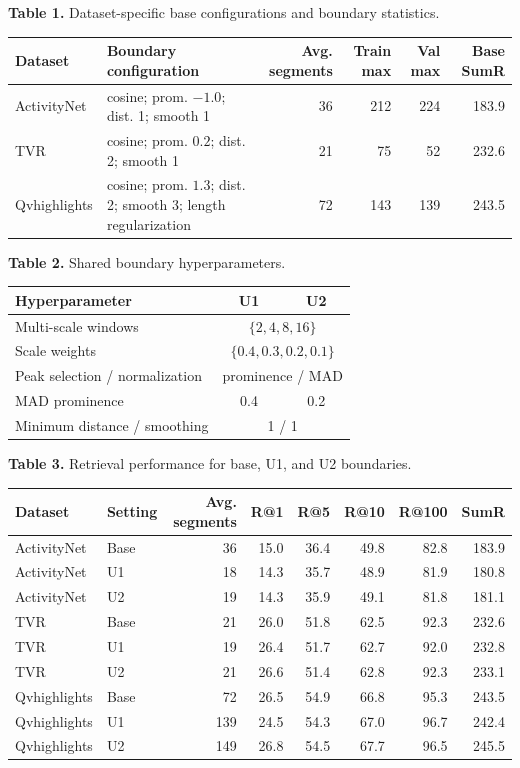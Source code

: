 \documentclass[10pt]{article}
\newcommand{\tablecaption}[2]{\begin{center}\footnotesize\textbf{Table #1.} #2\end{center}\vspace{-7pt}}
\begin{document}
\ifdefined\TABLE\else{}\fi
\ifcase\TABLE
\tablecaption{1}{Dataset-specific base configurations and boundary statistics.}
\begin{center}\small
\begin{tabular}{l l r r r r}
\toprule
Dataset & Boundary configuration & Avg. segments & Train max & Val max & Base SumR \\
\midrule
ActivityNet & cosine; prom. $-1.0$; dist. 1; smooth 1 & 36 & 212 & 224 & 183.9 \\
TVR & cosine; prom. $0.2$; dist. 2; smooth 1 & 21 & 75 & 52 & 232.6 \\
Qvhighlights & cosine; prom. $1.3$; dist. 2; smooth 3; length regularization & 72 & 143 & 139 & 243.5 \\
\bottomrule
\end{tabular}
\end{center}
\or
\tablecaption{2}{Shared boundary hyperparameters.}
\begin{center}\small
\begin{tabular}{l c c}
\toprule
Hyperparameter & U1 & U2 \\
\midrule
Multi-scale windows & \multicolumn{2}{c}{$\{2,4,8,16\}$} \\
Scale weights & \multicolumn{2}{c}{$\{0.4,0.3,0.2,0.1\}$} \\
Peak selection / normalization & \multicolumn{2}{c}{prominence / MAD} \\
MAD prominence & 0.4 & 0.2 \\
Minimum distance / smoothing & \multicolumn{2}{c}{1 / 1} \\
\bottomrule
\end{tabular}
\end{center}
\or
\tablecaption{3}{Retrieval performance for base, U1, and U2 boundaries.}
\begin{center}\small
\begin{tabular}{l l r r r r r r}
\toprule
Dataset & Setting & Avg. segments & R@1 & R@5 & R@10 & R@100 & SumR \\
\midrule
ActivityNet & Base & 36 & 15.0 & 36.4 & 49.8 & 82.8 & 183.9 \\
ActivityNet & U1 & 18 & 14.3 & 35.7 & 48.9 & 81.9 & 180.8 \\
ActivityNet & U2 & 19 & 14.3 & 35.9 & 49.1 & 81.8 & 181.1 \\
TVR & Base & 21 & 26.0 & 51.8 & 62.5 & 92.3 & 232.6 \\
TVR & U1 & 19 & 26.4 & 51.7 & 62.7 & 92.0 & 232.8 \\
TVR & U2 & 21 & 26.6 & 51.4 & 62.8 & 92.3 & 233.1 \\
Qvhighlights & Base & 72 & 26.5 & 54.9 & 66.8 & 95.3 & 243.5 \\
Qvhighlights & U1 & 139 & 24.5 & 54.3 & 67.0 & 96.7 & 242.4 \\
Qvhighlights & U2 & 149 & 26.8 & 54.5 & 67.7 & 96.5 & 245.5 \\
\bottomrule
\end{tabular}
\end{center}
\end{document}
